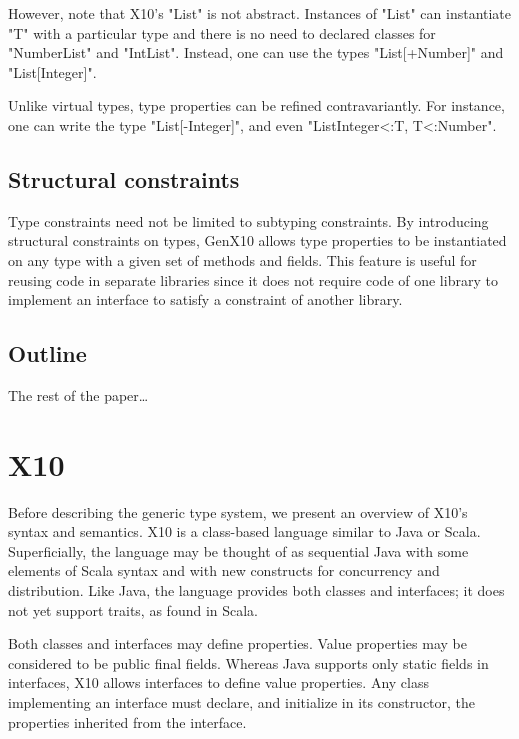 \documentclass[preprint,nocopyrightspace,9pt]{sigplanconf}
\begin{document}
However, note that X10's \xcd"List" is not abstract.
Instances of \xcd"List"
can instantiate \xcd"T" with a particular type and there is no need to declared classes for \xcd"NumberList" and \xcd"IntList".  Instead, one can use the types
\xcd"List[+Number]" and \xcd"List[Integer]".

Unlike virtual types, type properties can be refined contravariantly.
For instance, one can write the type \xcd"List[-Integer]",
and even \xcd"List{Integer<:T, T<:Number}".

\subsection{Structural constraints}

Type constraints need not be limited to subtyping constraints.
By introducing structural constraints on types, GenX10 allows
type properties to be instantiated on any type with a given set
of methods and fields. This feature is useful for reusing code
in separate libraries since it does not require 
code of one library to implement an interface to satisfy a
constraint of another library.


\subsection{Outline}

The rest of the paper\dots

\section{X10}

Before describing the generic type system, we present an
overview of X10's syntax and semantics.
X10 is a class-based language similar to Java or Scala.
Superficially, the language may be thought of as sequential
Java with some elements of Scala syntax and with new constructs
for concurrency and distribution.
Like Java, the language provides both classes and interfaces; it does not
yet support traits, as found in Scala.

Both classes and interfaces may define properties. Value
properties may be considered to be public final fields. Whereas
Java supports only static fields in interfaces, X10
allows interfaces to define value properties. Any class implementing
an interface must declare, and initialize in its
constructor,
the properties inherited from the interface.
\end{document}
